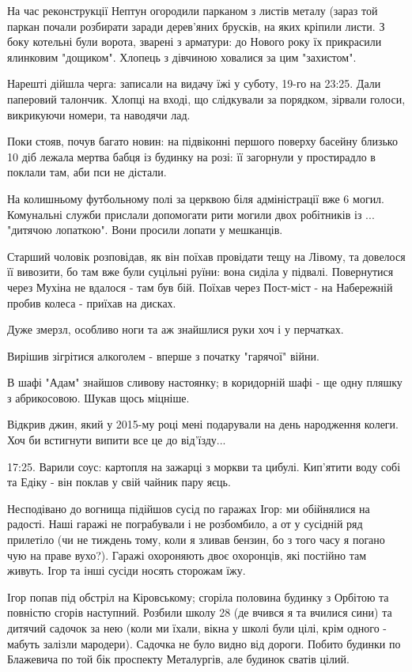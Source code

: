 На час реконструкції Нептун огородили парканом з листів металу (зараз той
паркан почали розбирати заради дерев'яних брусків, на яких кріпили листи. З
боку котельні були ворота, зварені з арматури: до Нового року їх прикрасили
ялинковим "дощиком". Хлопець з дівчиною ховалися за цим "захистом".

Нарешті дійшла черга: записали на видачу їжі у суботу, 19-го на 23:25. Дали
паперовий талончик. Хлопці на вході, що слідкували за порядком, зірвали голоси,
викрикуючи номери, та наводячи лад.

Поки стояв, почув багато новин: на підвіконні першого поверху басейну близько
10 діб лежала мертва бабця із будинку на розі: її загорнули у простирадло в
поклали там, аби пси не дістали.

На колишньому футбольному полі за церквою біля адміністрації вже 6 могил.
Комунальні служби прислали допомогати рити могили двох робітників із ...
"дитячою лопаткою". Вони просили лопати у мешканців.

Старший чоловік розповідав, як він поїхав провідати тещу  на Лівому, та
довелося її вивозити, бо там вже були суцільні руїни: вона сиділа у підвалі.
Повернутися через Мухіна не вдалося - там був бій. Поїхав через Пост-міст - на
Набережній пробив колеса - приїхав на дисках.

Дуже змерзл, особливо ноги та аж знайшлися руки хоч і у перчатках.

Вирішив зігрітися алкоголем - вперше з початку "гарячої" війни.

В шафі "Адам" знайшов сливову настоянку; в коридорній шафі - ще одну пляшку з
абрикосовою. Шукав щось міцніше.

Відкрив джин, який у 2015-му році мені подарували на день народження колеги.
Хоч би встигнути випити все це до від'їзду...

17:25. Варили соус: картопля на зажарці з моркви та цибулі. Кип'ятити воду собі
та Едіку - він поклав у свій чайник пару яєць.

Несподівано до вогнища підійшов сусід по гаражах Ігор: ми обійнялися на
радості. Наші гаражі не пограбували і не розбомбило, а от у сусідній ряд
прилетіло (чи не тиждень тому, коли я зливав бензин, бо з того часу я погано
чую на праве вухо?). Гаражі охороняють двоє охоронців, які постійно там живуть.
Ігор та інші сусіди носять сторожам їжу.

Ігор попав під обстріл на Кіровському; сгоріла половина будинку з Орбітою та
повністю сгорів наступний. Розбили школу 28 (де вчився я та вчилися сини) та
дитячий садочок за нею (коли ми їхали, вікна у школі були цілі, крім одного -
мабуть залізли мародери). Садочка не було видно від дороги. Побито будинки по
Блажевича по той бік проспекту Металургів, але будинок сватів цілий.

